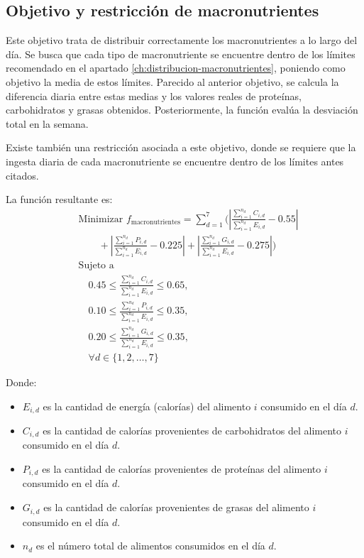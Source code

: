 \subsection{Objetivo y restricción de macronutrientes}
\label{ch:objetivo-restriccion-macronutrientes}

Este objetivo trata de distribuir correctamente los macronutrientes a lo largo del día. Se busca que cada tipo de macronutriente se encuentre dentro de los límites recomendado en el apartado \ref{ch:distribucion-macronutrientes}, poniendo como objetivo la media de estos límites. Parecido al anterior objetivo, se calcula la diferencia diaria entre estas medias y los valores reales de proteínas, carbohidratos y grasas obtenidos. Posteriormente, la función evalúa la desviación total en la semana.

Existe también una restricción asociada a este objetivo, donde se requiere que la ingesta diaria de cada macronutriente se encuentre dentro de los límites antes citados.

La función resultante es:
\[
\begin{aligned}
& \text{Minimizar } f_{\text{macronutrientes}} = \sum_{d=1}^{7} \Bigg( \left| \frac{\sum_{i=1}^{n_d} C_{i,d}}{\sum_{i=1}^{n_d} E_{i,d}} - 0.55 \right| \\
& \qquad + \left| \frac{\sum_{i=1}^{n_d} P_{i,d}}{\sum_{i=1}^{n_d} E_{i,d}} - 0.225 \right| + \left| \frac{\sum_{i=1}^{n_d} G_{i,d}}{\sum_{i=1}^{n_d} E_{i,d}} - 0.275 \right| \Bigg) \\
& \text{Sujeto a } \\
& \quad 0.45 \leq \frac{\sum_{i=1}^{n_d} C_{i,d}}{\sum_{i=1}^{n_d} E_{i,d}} \leq 0.65, \\
& \quad 0.10 \leq \frac{\sum_{i=1}^{n_d} P_{i,d}}{\sum_{i=1}^{n_d} E_{i,d}} \leq 0.35, \\
& \quad 0.20 \leq \frac{\sum_{i=1}^{n_d} G_{i,d}}{\sum_{i=1}^{n_d} E_{i,d}} \leq 0.35, \\
& \quad \forall d \in \{1, 2, \ldots, 7\}
\end{aligned}
\]
\newpage
\begin{small}
    Donde:
    \begin{itemize}
    \item \( E_{i,d} \) es la cantidad de energía (calorías) del alimento \( i \) consumido en el día \( d \).
    \item \( C_{i,d} \) es la cantidad de calorías provenientes de carbohidratos del alimento \( i \) consumido en el día \( d \).
    \item \( P_{i,d} \) es la cantidad de calorías provenientes de proteínas del alimento \( i \) consumido en el día \( d \).
    \item \( G_{i,d} \) es la cantidad de calorías provenientes de grasas del alimento \( i \) consumido en el día \( d \).
    \item \( n_d \) es el número total de alimentos consumidos en el día \( d \).
    \end{itemize}
\end{small}

